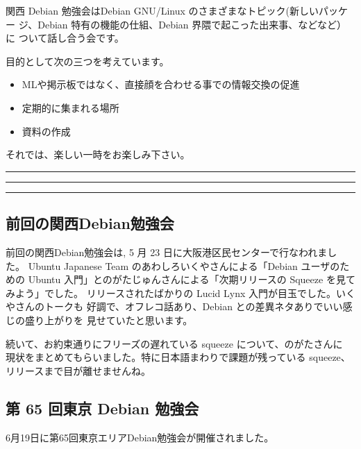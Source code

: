 \documentclass[mingoth,a4paper]{jsarticle}
\begin{document}
関西 Debian 勉強会はDebian GNU/Linux のさまざまなトピック(新しいパッケー
ジ、Debian 特有の機能の仕組、Debian 界隈で起こった出来事、などなど）に
ついて話し合う会です。

目的として次の三つを考えています。
\begin{itemize}
      \item MLや掲示板ではなく、直接顔を合わせる事での情報交換の促進
      \item 定期的に集まれる場所
      \item 資料の作成
\end{itemize}

それでは、楽しい一時をお楽しみ下さい。

\clearpage

\begin{minipage}[b]{0.2\hsize}
 {}
\end{minipage}
\begin{minipage}[b]{0.8\hsize}
\hrule
\vspace{2mm}
\hrule
\setcounter{tocdepth}{1}
\tableofcontents
\vspace{2mm}
\hrule
\end{minipage}


\subsection{前回の関西Debian勉強会}

前回の関西Debian勉強会は, 5 月 23 日に大阪港区民センターで行なわれました。
Ubuntu Japanese Team のあわしろいくやさんによる「Debian ユーザのための Ubuntu 入門」とのがたじゅんさんによる「次期リリースの Squeeze を見てみよう」でした。
%
リリースされたばかりの Lucid Lynx 入門が目玉でした。いくやさんのトークも
好調で、オフレコ話あり、Debian との差異ネタありでいい感じの盛り上がりを
見せていたと思います。

続いて、お約束通りにフリーズの遅れている squeeze について、のがたさんに
現状をまとめてもらいました。特に日本語まわりで課題が残っている squeeze、
リリースまで目が離せませんね。

\subsection{第 65 回東京 Debian 勉強会}

6月19日に第65回東京エリアDebian勉強会が開催されました。
\end{document}
